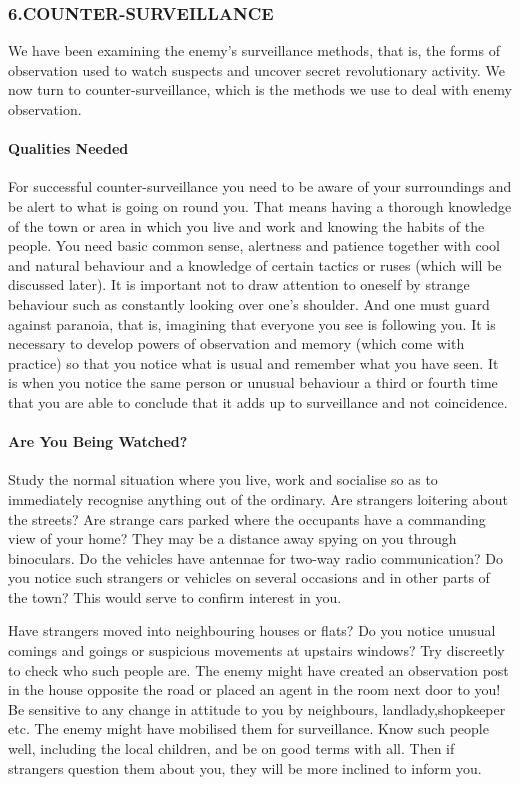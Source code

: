 \subsubsection{6.COUNTER-SURVEILLANCE}

We have been examining the enemy's surveillance methods, that is, the
forms of observation used to watch suspects and uncover secret
revolutionary activity. We now turn to counter-surveillance, which is
the methods we use to deal with enemy observation.

\paragraph{Qualities Needed}

For successful counter-surveillance you need to be aware of your
surroundings and be alert to what is going on round you. That means
having a thorough knowledge of the town or area in which you live and
work and knowing the habits of the people. You need basic common sense,
alertness and patience together with cool and natural behaviour and a
knowledge of certain tactics or ruses (which will be discussed later).
It is important not to draw attention to oneself by strange behaviour
such as constantly looking over one's shoulder. And one must guard
against paranoia, that is, imagining that everyone you see is following
you. It is necessary to develop powers of observation and memory (which
come with practice) so that you notice what is usual and remember what
you have seen. It is when you notice the same person or unusual
behaviour a third or fourth time that you are able to conclude that it
adds up to surveillance and not coincidence.

\paragraph{Are You Being Watched?}

Study the normal situation where you live, work and socialise so as to
immediately recognise anything out of the ordinary. Are strangers
loitering about the streets? Are strange cars parked where the occupants
have a commanding view of your home? They may be a distance away spying
on you through binoculars. Do the vehicles have antennae for two-way
radio communication? Do you notice such strangers or vehicles on several
occasions and in other parts of the town? This would serve to confirm
interest in you.

Have strangers moved into neighbouring houses or flats? Do you notice
unusual comings and goings or suspicious movements at upstairs windows?
Try discreetly to check who such people are. The enemy might have
created an observation post in the house opposite the road or placed an
agent in the room next door to you! Be sensitive to any change in
attitude to you by neighbours, landlady,shopkeeper etc. The enemy might
have mobilised them for surveillance. Know such people well, including
the local children, and be on good terms with all. Then if strangers
question them about you, they will be more inclined to inform you.

